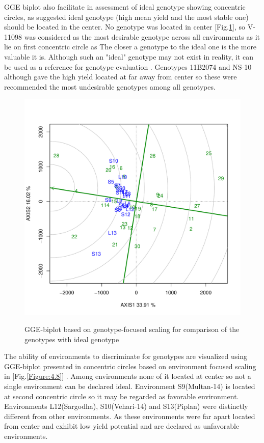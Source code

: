 GGE biplot also facilitate in assessment of ideal genotype showing concentric circles, as \citep{Farshadfar2008} suggested ideal genotype (high mean yield and the most stable one) should be located in the center. No genotype was located in center [Fig.\ref{Figure:4.7}], so V-11098 was considered as the most desirable genotype across all environments as it lie on first concentric circle as The closer a genotype to the ideal one is the more valuable it is. Although such an "ideal" genotype may not exist in reality, it can be used as a reference for genotype evaluation \citep{Yan2005}. Genotypes  11B2074 and NS-10 although gave the high yield located at far away from center so these were recommended the most  undesirable genotypes among all genotypes. 
\begin{figure} [H]
	\centering  
	\scalebox{0.3}
	{\includegraphics[width=490mm]{02ThesisMain/Ch04RD/figures/idealg}}
	\caption[Comparison of the genotypes with ideal genotype]{GGE-biplot based on genotype-focused scaling for comparison of the genotypes with ideal genotype}
\label{Figure:4.7}
\end{figure}



The ability of environments to discriminate for genotypes are visualized using GGE-biplot presented in concentric circles based on environment focused scaling in [Fig.\ref{Figure:4.8}] . Among environments none of it located at center so not a single environment can be declared ideal. Environment S9(Multan-14) is located at second concentric circle so it may be regarded as favorable environment. Environments  L12(Sargodha), S10(Vehari-14) and S13(Piplan) were distinctly different from other environments. As these environments  were far apart located from center and exhibit low yield potential and are declared as unfavorable environments.

